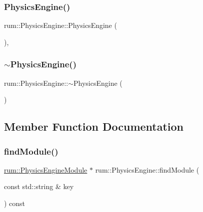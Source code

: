\subsubsection{\texorpdfstring{Physics\+Engine()}{PhysicsEngine()}}
{\footnotesize\ttfamily rum\+::\+Physics\+Engine\+::\+Physics\+Engine (\begin{DoxyParamCaption}{ }\end{DoxyParamCaption})\hspace{0.3cm}{\ttfamily [explicit]}, {\ttfamily [default]}}

\mbox{\label{classrum_1_1_physics_engine_ad88a3f6114a8851c682de8b3c09c8da8}} 
\subsubsection{\texorpdfstring{$\sim$\+Physics\+Engine()}{~PhysicsEngine()}}
{\footnotesize\ttfamily rum\+::\+Physics\+Engine\+::$\sim$\+Physics\+Engine (\begin{DoxyParamCaption}{ }\end{DoxyParamCaption})\hspace{0.3cm}{\ttfamily [default]}}



\subsection{Member Function Documentation}
\mbox{\label{classrum_1_1_physics_engine_a6f7576c08977338be44f39789179a19d}} 
\subsubsection{\texorpdfstring{find\+Module()}{findModule()}}
{\footnotesize\ttfamily \mbox{\hyperlink{classrum_1_1_physics_engine_module}{rum\+::\+Physics\+Engine\+Module}} $\ast$ rum\+::\+Physics\+Engine\+::find\+Module (\begin{DoxyParamCaption}\item[{const std\+::string \&}]{key }\end{DoxyParamCaption}) const}

